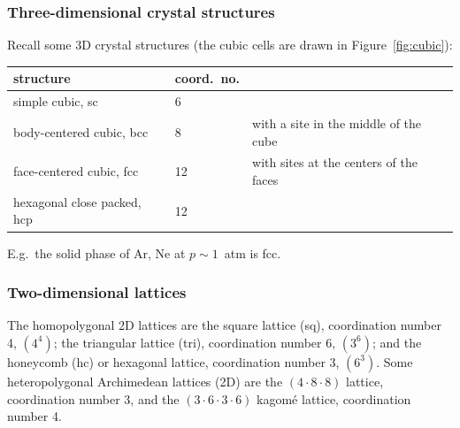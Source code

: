 \subsubsection*{Three-dimensional crystal structures}

Recall some 3D crystal structures (the cubic cells are drawn in
Figure~\ref{fig:cubic}):
\begin{center}
\begin{tabular}{lll}
  structure & coord.\ no. & \\ \hline
  simple cubic, sc & 6 & \\
  body-centered cubic, bcc & 8 & with a site in the middle of the cube\\
  face-centered cubic, fcc & 12 & with sites at the centers of the faces\\
  hexagonal close packed, hcp & 12 &
\end{tabular}
\end{center}
E.g.\ the solid phase of Ar, Ne at $p\sim 1$~atm is fcc.

\subsubsection*{Two-dimensional lattices}

The homopolygonal 2D lattices are the square lattice (sq), coordination number 4,
$(4^4)$; the triangular lattice (tri), coordination number 6, $(3^6)$; and the
honeycomb (hc) or hexagonal lattice, coordination number 3, $(6^3)$. Some
heteropolygonal Archimedean lattices (2D) are the $(4\cdot 8\cdot 8)$ lattice,
coordination number 3, and the $(3\cdot 6\cdot 3\cdot 6)$ kagom\'e lattice,
coordination number 4.

